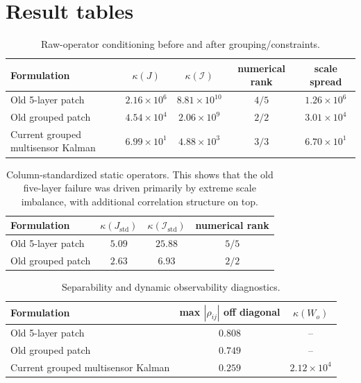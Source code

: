 \documentclass[11pt]{article}
\begin{document}
\section{Result tables}

\begin{table}[ht]
\centering
\caption{Raw-operator conditioning before and after grouping/constraints.}
\begin{tabular}{lcccc}
\toprule
Formulation & $\kappa(J)$ & $\kappa(\mathcal{I})$ & numerical rank & scale spread \\
\midrule
Old 5-layer patch & $2.16\times 10^6$ & $8.81\times 10^{10}$ & $4/5$ & $1.26\times 10^6$ \\
Old grouped patch & $4.54\times 10^4$ & $2.06\times 10^9$ & $2/2$ & $3.01\times 10^4$ \\
Current grouped multisensor Kalman & $6.99\times 10^1$ & $4.88\times 10^3$ & $3/3$ & $6.70\times 10^1$ \\
\bottomrule
\end{tabular}
\end{table}

\begin{table}[ht]
\centering
\caption{Column-standardized static operators. This shows that the old five-layer failure was driven primarily by extreme scale imbalance, with additional correlation structure on top.}
\begin{tabular}{lccc}
\toprule
Formulation & $\kappa(J_{\mathrm{std}})$ & $\kappa(\mathcal{I}_{\mathrm{std}})$ & numerical rank \\
\midrule
Old 5-layer patch & $5.09$ & $25.88$ & $5/5$ \\
Old grouped patch & $2.63$ & $6.93$ & $2/2$ \\
\bottomrule
\end{tabular}
\end{table}

\begin{table}[ht]
\centering
\caption{Separability and dynamic observability diagnostics.}
\begin{tabular}{lcc}
\toprule
Formulation & max $|\rho_{ij}|$ off diagonal & $\kappa(W_o)$ \\
\midrule
Old 5-layer patch & $0.808$ & -- \\
Old grouped patch & $0.749$ & -- \\
Current grouped multisensor Kalman & $0.259$ & $2.12\times 10^4$ \\
\bottomrule
\end{tabular}
\end{table}
\end{document}
